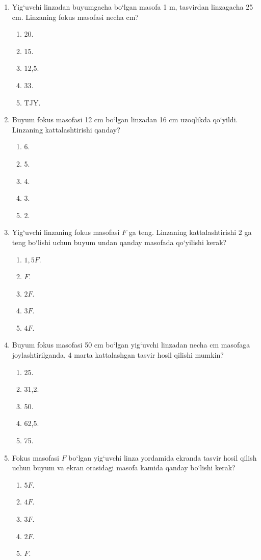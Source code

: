 \begin{enumerate}

\item Yig‘uvchi linzadan buyumgacha bo‘lgan masofa 1 m, tasvirdan linzagacha 25 cm. Linzaning fokus masofasi necha cm?
\begin{enumerate}[label=\Alph*)]
\item 20.
\item 15.
\item 12,5.
\item 33.
\item TJY.
\end{enumerate}

\item Buyum fokus masofasi 12 cm bo‘lgan linzadan 16 cm uzoqlikda qo‘yildi. Linzaning kattalashtirishi qanday?
\begin{enumerate}[label=\Alph*)]
\item 6.
\item 5.
\item 4.
\item 3.
\item 2.
\end{enumerate}

\item Yig‘uvchi linzaning fokus masofasi $F$ ga teng. Linzaning kattalashtirishi 2 ga teng bo‘lishi uchun buyum undan qanday masofada qo‘yilishi kerak?
\begin{enumerate}[label=\Alph*)]
\item $1{,}5F$.
\item $F$.
\item $2F$.
\item $3F$.
\item $4F$.
\end{enumerate}

\item Buyum fokus masofasi 50 cm bo‘lgan yig‘uvchi linzadan necha cm masofaga joylashtirilganda, 4 marta kattalashgan tasvir hosil qilishi mumkin?
\begin{enumerate}[label=\Alph*)]
\item 25.
\item 31,2.
\item 50.
\item 62,5.
\item 75.
\end{enumerate}

\item Fokus masofasi $F$ bo‘lgan yig‘uvchi linza yordamida ekranda tasvir hosil qilish uchun buyum va ekran orasidagi masofa kamida qanday bo‘lishi kerak?
\begin{enumerate}[label=\Alph*)]
\item $5F$.
\item $4F$.
\item $3F$.
\item $2F$.
\item $F$.
\end{enumerate}


\end{enumerate}
